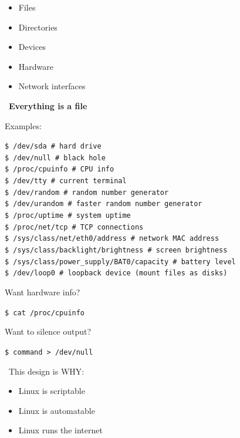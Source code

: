 \documentclass[12pt]{article}
\newcommand{\handicon}{\faHandPointRight}
\begin{document}
\begin{itemize}
    \item Files
    \item Directories
    \item Devices
    \item Hardware
    \item Network interfaces
\end{itemize}

\handicon\ \textbf{Everything is a file}

Examples:

\begin{highlightbox}
\texttt{\$ /dev/sda      \# hard drive}\\
\texttt{\$ /dev/null     \# black hole}\\
\texttt{\$ /proc/cpuinfo \# CPU info}\\
\texttt{\$ /dev/tty      \# current terminal}\\
\texttt{\$ /dev/random   \# random number generator}\\
\texttt{\$ /dev/urandom  \# faster random number generator}\\
\texttt{\$ /proc/uptime       \# system uptime}\\
\texttt{\$ /proc/net/tcp      \# TCP connections}\\
\texttt{\$ /sys/class/net/eth0/address  \# network MAC address}\\
\texttt{\$ /sys/class/backlight/brightness  \# screen brightness}\\
\texttt{\$ /sys/class/power\_supply/BAT0/capacity  \# battery level}\\
\texttt{\$ /dev/loop0    \# loopback device (mount files as disks)}
\end{highlightbox}

Want hardware info?

\begin{highlightbox}
\texttt{\$ cat /proc/cpuinfo}
\end{highlightbox}

Want to silence output?

\begin{highlightbox}
\texttt{\$ command > /dev/null}
\end{highlightbox}

\begin{infobox}
\handicon\ This design is WHY:
\begin{itemize}
    \item Linux is scriptable
    \item Linux is automatable
    \item Linux runs the internet
\end{itemize}
\end{infobox}
\end{document}

